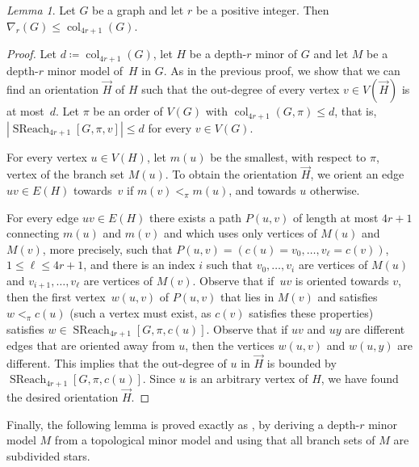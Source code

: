 \documentclass[1p,number,a4paper]{elsarticle}
\theoremstyle{remark}
\DeclareMathOperator{\col}{col}
\DeclareMathOperator{\SReach}{SReach}
\newtheorem{lemma}[theorem]{Lemma}
\begin{document}



\begin{lemma}\label{lem:lowerbound-nabla-col}
 Let $G$ be a graph and let $r$ be a positive integer. Then 
 $\nabla_r(G)\leq \col_{4r+1}(G)$. 
\end{lemma}
\begin{proof}
 Let $d\coloneqq \col_{4r+1}(G)$, let $H$ be a depth-$r$ minor of $G$ and let $M$ be a depth-$r$ minor model of~$H$ in $G$. As in the 
previous proof, we show that we can find an orientation 
$\vec{H}$ of $H$ such that the out-degree of every vertex $v\in V(\vec{H})$ is at most~$d$. Let $\pi$ be an order of $V(G)$ with
$\col_{4r+1}(G,\pi)\leq d$, that is, $|\SReach_{4r+1}[G,\pi,v]|\leq d$ 
for every $v\in V(G)$. 
 
For every vertex $u\in V(H)$, let $m(u)$ be the smallest, 
with respect to $\pi$, vertex of the branch set $M(u)$. To obtain
the orientation $\vec{H}$, we orient an edge $uv\in E(H)$ towards~$v$ if $m(v)<_\pi m(u)$, and towards $u$ otherwise. 

For every edge $uv\in E(H)$ there exists a path $P(u,v)$
of length at most \mbox{$4r+1$} connecting $m(u)$ and $m(v)$ and
which uses only vertices of $M(u)$ and $M(v)$, more precisely, such that
$P(u,v)=(c(u)=v_0,\ldots, v_\ell=c(v))$, $1\leq \ell\leq 4r+1$, and there is an index $i$
such that $v_0,\ldots, v_i$ are vertices of $M(u)$ and $v_{i+1},\ldots, v_\ell$ are vertices of $M(v)$. 
Observe that if~$uv$ is oriented towards $v$, 
then the first vertex~$w(u,v)$ of $P(u,v)$ that lies in $M(v)$ and satisfies $w<_\pi c(u)$ (such a vertex must exist, as $c(v)$ satisfies these properties)
satisfies $w\in \SReach_{4r+1}[G,\pi,c(u)]$. Observe that 
if $uv$ and $uy$ are different edges that are oriented away 
from $u$, then the vertices $w(u,v)$ and $w(u,y)$ are 
different. 
This implies that the out-degree of $u$ in $\vec{H}$ is bounded
by $\SReach_{4r+1}[G,\pi,c(u)]$.  Since $u$ is an arbitrary
vertex of $H$, we have found the desired orientation $\vec{H}$.
\end{proof}

Finally, the following lemma is proved exactly as , by deriving a depth-$r$ minor model $M$ from a topological minor model and using that all branch sets of $M$ are subdivided stars. 
\end{document}
